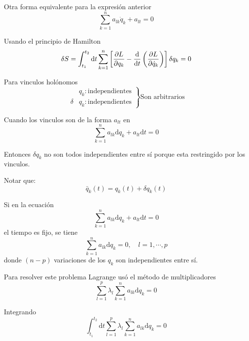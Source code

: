 \documentclass[../main]{subfiles}
\begin{document}
Otra forma equivalente para la expresión anterior
\begin{equation}
    \sum_{k=1}^n a_{lk}\dot{q}_k+a_{lt}=0
\end{equation}

Usando el principio de Hamilton
\begin{equation}
    \delta S= \int_{t_1}^{t_2}\mathrm{d}t\sum_{k=1}^n \left[\pdv{L}{q_k}-\dv{}{t}\left(\pdv{L}{\dot{q}_k}\right)\right]\delta q_k=0
\end{equation}

Para vinculos holónomos
\begin{equation*}
    \left.
    \begin{split}
        &q_k: \text{independientes}\\
        \delta &q_k: \text{independientes}
    \end{split}
    \right\} \text{Son arbitrarios}
\end{equation*}

Cuando los vinculos son de la forma $a_{lt}$ en
\begin{equation}
    \sum_{k=1}^n a_{lk}\mathrm{d}q_k+a_{lt}\mathrm{d}t=0
\end{equation}

Entonces $\delta q_k$ no son todos independientes entre sí porque esta restringido por los vinculos.

Notar que:
\begin{equation}
    \bar{q}_k(t)=q_k(t)+\delta q_k(t)
\end{equation}

Si en la ecuación
\begin{equation}
    \sum_{k=1}^n a_{lk}\mathrm{d}q_k+a_{lt}\mathrm{d}t=0
\end{equation}
el tiempo es fijo, se tiene
\begin{equation}
    \sum_{k=1}^n a_{lk}\mathrm{d}q_k=0, \quad l=1,\cdots, p
\end{equation}
donde $(n-p)$ variaciones de los $q_k$ son independientes entre sí.

Para resolver este problema Lagrange usó el método de multiplicadores
\begin{equation}
    \sum_{l=1}^p \lambda_l \sum_{k=1}^n a_{lk}\mathrm{d}q_k=0
\end{equation}

Integrando
\begin{equation}
    \int_{t_1}^{t_2} \mathrm{d}t\sum_{l=1}^p \lambda_l \sum_{k=1}^n a_{lk}\mathrm{d}q_k=0 \tag{$\omega$} \label{ec:2.omega}
\end{equation}
\end{document}
